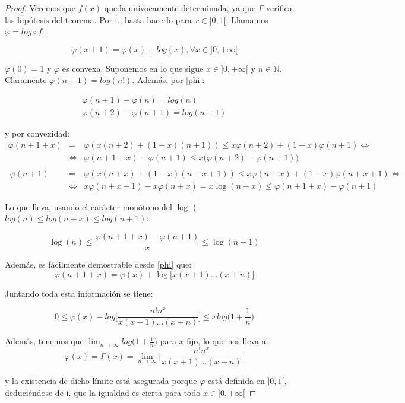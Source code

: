 \documentclass[a4paper, 11pt]{amsart}
\theoremstyle{definition}
\theoremstyle{remark}
\numberwithin{equation}{section}
\begin{document}
  \begin{proof}
   Veremos que $f(x)$ queda unívocamente determinada, ya que $\Gamma$ verifica las hipótesis del teorema.
   Por i., basta hacerlo para $x\in]0,1[$. Llamamos $\varphi = log \circ f$:
   
   \begin{equation}
    \varphi (x+1) = \varphi(x) + log(x), \forall x\in]0,+\infty[
    \label{phi}
   \end{equation}
   
   $\varphi(0) = 1$ y $\varphi$ es convexa. Suponemos en lo que sigue $ x\in]0,+\infty[$ y $n\in \mathbb{N}$.
   Claramente $\varphi(n+1) = log(n!)$. Además, por \ref{phi}:
   
   \begin{eqnarray*}
    \varphi(n+1)-\varphi(n) = log(n)\\
    \varphi(n+2)-\varphi(n+1) = log(n+1)
   \end{eqnarray*}
   
   y por convexidad:
   \begin{eqnarray*}
    \varphi (n+1+x) &=& \varphi(x(n+2) +(1-x)(n+1)) \le x\varphi(n+2) + (1-x)\varphi(n+1) \Leftrightarrow\\
    &\Leftrightarrow& \varphi (n+1+x) - \varphi(n+1) \le x\big(\varphi(n+2)-\varphi(n+1)\big)\\
    \\\
    \varphi(n+1) &=& \varphi(x(n+x)+(1-x)(n+x+1)) \le x\varphi(n+x) + (1-x) \varphi(n+x+1) \Leftrightarrow\\
    &\Leftrightarrow& x\varphi(n+x+1) - x\varphi(n+x) = x\log(n+x) \le \varphi(n+1+x)-\varphi(n+1)
   \end{eqnarray*}
   
   Lo que lleva, usando el carácter monótono del $\log$ ($log(n) \le log(n+x) \le log(n+1)$:
   
   $$\log(n) \le \frac{\varphi(n+1+x)-\varphi(n+1)}{x} \le \log(n+1)$$
   
   Además, es fácilmente demostrable desde \ref{phi} que:
   \begin{equation}
    \varphi(n+1+x) = \varphi(x) + \log\big[x(x+1)\ldots(x+n)\big]
   \end{equation}
   
   Juntando toda esta información se tiene:
   
   $$0\le \varphi(x) - log \bigg[\frac{n!n^x}{x(x+1)\ldots (x+n)}\bigg] \le xlog\bigg(1+\frac{1}{n}\bigg)$$
   
   Además, tenemos que $\lim_{n\rightarrow \infty} log\bigg(1+\frac{1}{n}\bigg)$ para $x$ fijo, lo que nos lleva a:\\
   $$\varphi(x) = \Gamma(x) = \lim_{n\rightarrow \infty} \bigg[\frac{n!n^x}{x(x+1)\ldots (x+n)}\bigg] $$
   
   y la existencia de dicho límite está asegurada porque $\varphi$ está definida en $]0,1[$, deduciéndose
   de i. que la igualdad es cierta para todo $x\in]0,+\infty[$
  \end{proof}
\end{document}
